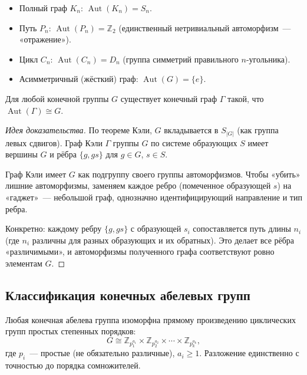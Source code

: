 \documentclass[12pt]{article}
\begin{document}
	\begin{example}
		\begin{itemize}
			\item Полный граф $K_n$: $\operatorname{Aut}(K_n) = S_n$.
			\item Путь $P_n$: $\operatorname{Aut}(P_n) = \mathbb{Z}_2$ (единственный нетривиальный автоморфизм~--- «отражение»).
			\item Цикл $C_n$: $\operatorname{Aut}(C_n) = D_n$ (группа симметрий правильного $n$-угольника).
			\item Асимметричный (жёсткий) граф: $\operatorname{Aut}(G) = \{e\}$.
		\end{itemize}
	\end{example}
	
	\begin{theorem}[Фрухт, 1939]
		Для любой конечной группы $G$ существует конечный граф $\Gamma$ такой, что $\operatorname{Aut}(\Gamma) \cong G$.
	\end{theorem}
	
	\begin{proof}[Идея доказательства]
		По теореме Кэли, $G$ вкладывается в $S_{|G|}$ (как группа левых сдвигов). Граф Кэли $\Gamma$ группы $G$ по системе образующих $S$ имеет вершины $G$ и рёбра $\{g, gs\}$ для $g \in G$, $s \in S$.
		
		Граф Кэли имеет $G$ как подгруппу своего группы автоморфизмов. Чтобы «убить» лишние автоморфизмы, заменяем каждое ребро (помеченное образующей $s$) на «гаджет»~--- небольшой граф, однозначно идентифицирующий направление и тип ребра.
		
		Конкретно: каждому ребру $\{g, gs\}$ с образующей $s_i$ сопоставляется путь длины $n_i$ (где $n_i$ различны для разных образующих и их обратных). Это делает все рёбра «различимыми», и автоморфизмы полученного графа соответствуют ровно элементам $G$.
	\end{proof}
	
	\subsection{Классификация конечных абелевых групп}
	
	\begin{theorem}
		Любая конечная абелева группа изоморфна прямому произведению циклических групп простых степенных порядков:
		\[G \cong \mathbb{Z}_{p_1^{a_1}} \times \mathbb{Z}_{p_2^{a_2}} \times \cdots \times \mathbb{Z}_{p_k^{a_k}},\]
		где $p_i$~--- простые (не обязательно различные), $a_i \geqslant 1$. Разложение единственно с точностью до порядка сомножителей.
	\end{theorem}
	
\end{document}
